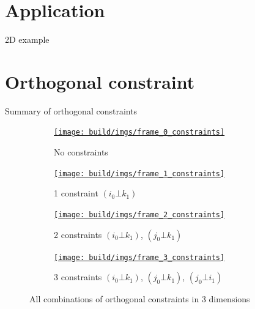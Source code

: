 \documentclass[10pt, xcolor={usenames, dvipsnames}]{beamer}
\begin{document}
    \section{Application}

        \begin{frame}{2D example}
            
        \end{frame}

    \section{Orthogonal constraint}
    
        \begin{frame}{Summary of orthogonal constraints}
            \begin{figure}
                \begin{subfigure}[t]{0.24\textwidth}
                    \centering
                    \href{run:frame_0_constraints.mp4?autostart&loop}{\texttt{[image: build/imgs/frame\_0\_constraints]}}
                    \caption{No constraints}
                    \label{fig:constraints_0}
                \end{subfigure}
                \hfill
                \begin{subfigure}[t]{0.24\textwidth}
                    \centering
                    \href{run:frame_1_constraints.mp4?autostart&loop}{\texttt{[image: build/imgs/frame\_1\_constraints]}}
                    \caption{1 constraint $(i_0 \bot k_1)$}
                    \label{fig:constraints_1}
                \end{subfigure}
                \hfill
                \begin{subfigure}[t]{0.24\textwidth}
                    \centering
                    \href{run:frame_2_constraints.mp4?autostart&loop}{\texttt{[image: build/imgs/frame\_2\_constraints]}}
                    \caption{2 constraints $(i_0 \bot k_1)$, $(j_0 \bot k_1)$}
                    \label{fig:constraints_2}
                \end{subfigure}
                \hfill
                \begin{subfigure}[t]{0.24\textwidth}
                    \centering
                    \href{run:frame_3_constraints.mp4?autostart&loop}{\texttt{[image: build/imgs/frame\_3\_constraints]}}
                    \caption{3 constraints $(i_0 \bot k_1)$, $(j_0 \bot k_1)$, $(j_0 \bot i_1)$}
                    \label{fig:constraints_3}
                \end{subfigure}
                \caption{All combinations of orthogonal constraints in 3 dimensions}
            \end{figure}
        \end{frame}
\end{document}
